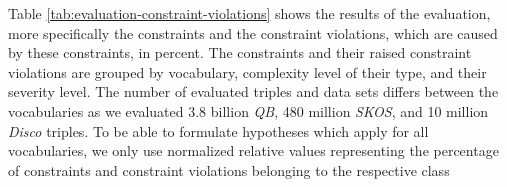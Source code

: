 \documentclass{llncs}
\newcommand{\tb}[1]{\todo[size=\small, color=green!40]{\textbf{Thomas:} #1}}
\begin{document}
Table \ref{tab:evaluation-constraint-violations} shows the results of the evaluation, more specifically the constraints and the constraint violations, which are caused by these constraints, in percent.
The constraints and their raised constraint violations are grouped by vocabulary, complexity level of their type, and their severity level.
The number of evaluated triples and data sets differs between the vocabularies
as we evaluated 3.8 billion \emph{QB}, 480 million \emph{SKOS}, and 10 million \emph{Disco} triples.
To be able to formulate hypotheses which apply for all vocabularies, 
we only use normalized relative values representing the percentage of constraints and constraint violations belonging to the respective class

\end{document}
